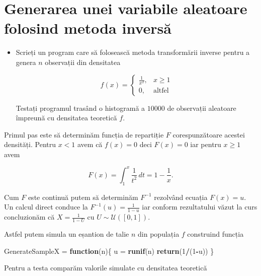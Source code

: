 \documentclass[]{article}
\newenvironment{Shaded}{\begin{snugshade}}{\end{snugshade}}
\newcommand{\KeywordTok}[1]{\textcolor[rgb]{0.13,0.29,0.53}{\textbf{#1}}}
\newcommand{\DecValTok}[1]{\textcolor[rgb]{0.00,0.00,0.81}{#1}}
\newcommand{\StringTok}[1]{\textcolor[rgb]{0.31,0.60,0.02}{#1}}
\newcommand{\ControlFlowTok}[1]{\textcolor[rgb]{0.13,0.29,0.53}{\textbf{#1}}}
\newcommand{\OperatorTok}[1]{\textcolor[rgb]{0.81,0.36,0.00}{\textbf{#1}}}
\newcommand{\NormalTok}[1]{#1}
\newenvironment{frshaded*}{%
  \def\FrameCommand{\fboxrule=\FrameRule\fboxsep=\FrameSep \fcolorbox{framecolor}{shadecolor1}}%
  \MakeFramed {\advance\hsize-\width \FrameRestore}}%
{\endMakeFramed}
\newenvironment{rmdblock}[1]
  {\begin{frshaded*}
  \begin{itemize}
  \renewcommand{\labelitemi}{
    \raisebox{-.7\height}[0pt][0pt]{
      {\setkeys{Gin}{width=2em,keepaspectratio}\texttt{[image: images/icons/\#1]}}
    }
  }
  \item
  }
  {
  \end{itemize}
  \end{frshaded*}
  }
\newenvironment{rmdexercise}
  {\begin{rmdblock}{exercise}}
  {\end{rmdblock}}
\begin{document}
\section{Generarea unei variabile aleatoare folosind metoda
inversă}\label{generarea-unei-variabile-aleatoare-folosind-metoda-inversa}

\begin{rmdexercise}
Scrieți un program care să folosească metoda transformării inverse
pentru a genera \(n\) observații din densitatea

\[
  f(x) = \left\{\begin{array}{ll}
        \frac{1}{x^2}, & x\geq 1\\
        0, & \text{altfel}
  \end{array}\right.
\]

Testați programul trasând o histogramă a \(10000\) de observații
aleatoare împreună cu densitatea teoretică \(f\).
\end{rmdexercise}

Primul pas este să determinăm funcția de repartiție \(F\)
corespunzătoare acestei densități. Pentru \(x<1\) avem că \(f(x)=0\)
deci \(F(x)=0\) iar pentru \(x\geq 1\) avem

\[
  F(x) = \int_{1}^{x}\frac{1}{t^2}\, dt = 1 - \frac{1}{x}.
\]

Cum \(F\) este continuă putem să determinăm \(F^{-1}\) rezolvând ecuația
\(F(x)=u\). Un calcul direct conduce la \(F^{-1}(u)=\frac{1}{1-u}\) iar
conform rezultatului văzut la curs concluzionăm că \(X = \frac{1}{1-U}\)
cu \(U\sim \mathcal{U}([0,1])\).

Astfel putem simula un eșantion de talie \(n\) din populația \(f\)
construind funcția

\begin{Shaded}
\begin{Highlighting}[]
\NormalTok{GenerateSampleX =}\StringTok{ }\ControlFlowTok{function}\NormalTok{(n)\{}
\NormalTok{  u =}\StringTok{ }\KeywordTok{runif}\NormalTok{(n)}
  \KeywordTok{return}\NormalTok{(}\DecValTok{1}\OperatorTok{/}\NormalTok{(}\DecValTok{1}\OperatorTok{-}\NormalTok{u))}
\NormalTok{\}}
\end{Highlighting}
\end{Shaded}

Pentru a testa comparăm valorile simulate cu densitatea teoretică
\end{document}
